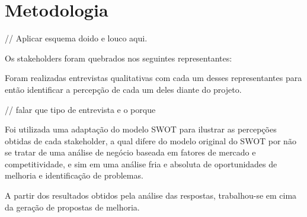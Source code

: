 \chapter[Metodologia]{Metodologia}
\label{chap:metodologia}

// Aplicar esquema doido e louco aqui.

Os stakeholders foram quebrados nos seguintes representantes:

Foram realizadas entrevistas qualitativas com cada um desses representantes para então identificar a percepção de cada um deles diante do projeto.

// falar que tipo de entrevista e o porque

Foi utilizada uma adaptação do modelo SWOT para ilustrar as percepções obtidas de cada stakeholder, a qual difere do modelo original do SWOT por não se tratar de uma análise de negócio baseada em fatores de mercado e competitividade, e sim em uma análise fria e absoluta de oportunidades de melhoria e identificação de problemas.

A partir dos resultados obtidos pela análise das respostas, trabalhou-se em cima da geração de propostas de melhoria.